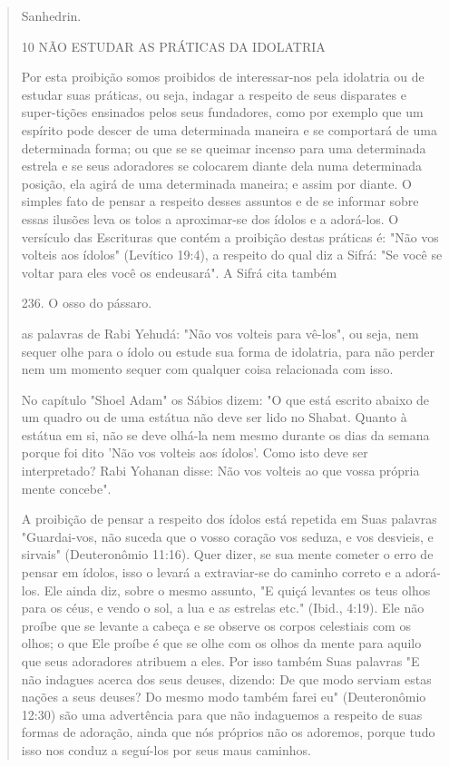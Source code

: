 \begin{quote}
Sanhedrin.

10 NÃO ESTUDAR AS PRÁTICAS DA IDOLATRIA

Por esta proibição somos proibidos de interessar-nos pela idolatria ou
de estudar suas práticas, ou seja, indagar a respeito de seus disparates
e super-tições ensinados pelos seus fundadores, como por exemplo que um
espírito po­de descer de uma determinada maneira e se comportará de uma
determinada forma; ou que se se queimar incenso para uma determinada
estrela e se seus ado­radores se colocarem diante dela numa determinada
posição, ela agirá de uma determinada maneira; e assim por diante. O
simples fato de pensar a respeito desses assuntos e de se informar sobre
essas ilusões leva os tolos a aproximar-se dos ídolos e a adorá-los. O
versículo das Escrituras que contém a proibição des­tas práticas é: "Não
vos volteis aos ídolos" (Levítico 19:4), a respeito do qual diz a Sifrá:
"Se você se voltar para eles você os endeusará". A Sifrá cita também

236. O osso do pássaro.

as palavras de Rabi Yehudá: "Não vos volteis para vê-los", ou seja, nem
sequer olhe para o ídolo ou estude sua forma de idolatria, para não
perder nem um momento sequer com qualquer coisa relacionada com isso.

No capítulo "Shoel Adam" os Sábios dizem: "O que está escrito abai­xo de
um quadro ou de uma estátua não deve ser lido no Shabat. Quanto à
estátua em si, não se deve olhá-la nem mesmo durante os dias da semana
por­que foi dito 'Não vos volteis aos ídolos'. Como isto deve ser
interpretado? Rabi Yohanan disse: Não vos volteis ao que vossa própria
mente concebe".

A proibição de pensar a respeito dos ídolos está repetida em Suas
pa­lavras "Guardai-vos, não suceda que o vosso coração vos seduza, e vos
desvieis, e sirvais" (Deuteronômio 11:16). Quer dizer, se sua mente
cometer o erro de pen­sar em ídolos, isso o levará a extraviar-se do
caminho correto e a adorá-los. Ele ainda diz, sobre o mesmo assunto, "E
quiçá levantes os teus olhos para os céus, e vendo o sol, a lua e as
estrelas etc." (Ibid., 4:19). Ele não proíbe que se levante a cabeça e
se observe os corpos celestiais com os olhos; o que Ele proíbe é que se
olhe com os olhos da mente para aquilo que seus adoradores atribuem a
eles. Por isso também Suas palavras "E não indagues acerca dos seus
deuses, dizendo: De que modo serviam estas nações a seus deuses? Do
mesmo modo também fa­rei eu" (Deuteronômio 12:30) são uma advertência
para que não indaguemos a respeito de suas formas de adoração, ainda que
nós próprios não os adoremos, porque tudo isso nos conduz a seguí-los
por seus maus caminhos.


\end{quote}
